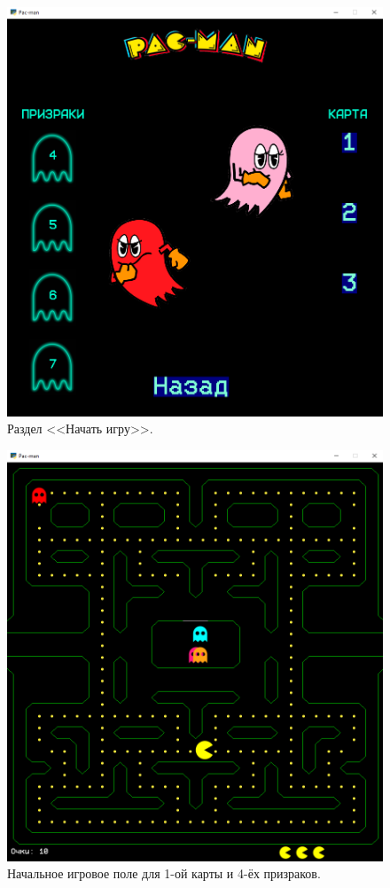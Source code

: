 \documentclass[14pt, oneside]{altsu-report}
\begin{document}
\begin{figure}[H]
	\centering
	\includegraphics[width=1\linewidth]{images/3.png}
	\caption{Раздел <<Начать игру>>.}
	\label{fig4}
\end{figure}

\begin{figure}[H]
	\centering
	\includegraphics[width=1\linewidth]{images/4.png}
	\caption{Начальное игровое поле для 1-ой карты и 4-ёх призраков.}
	\label{fig5}
\end{figure}
\end{document}
